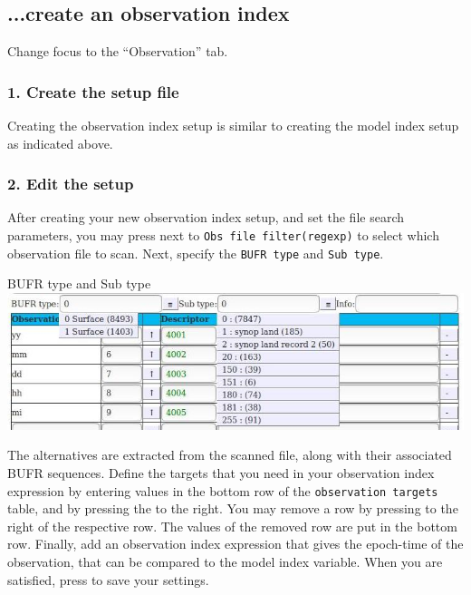 \documentclass[letterpaper,10pt,twoside,twocolumn,openany]{book}
\begin{document}
{\subsection{...create an observation index}
Change focus to the ``Observation'' tab. 

\subsubsection{1. Create the setup file}
Creating the observation index setup is similar to creating the model index setup as indicated above.

\subsubsection{2. Edit the setup}
After creating your new observation index setup, and set the file search parameters,
you may press  next to
\lstinline!Obs file filter(regexp)! to select which observation file to scan.
Next, specify the \lstinline!BUFR type! and \lstinline!Sub type!.
\begin{paperbox}{BUFR type and Sub type}
  \includegraphics[width=\columnwidth]{how_obs.jpg}
\end{paperbox}
The alternatives are extracted from the scanned file, along with their associated BUFR sequences.
Define the targets that you need in your observation index expression by entering values
in the bottom row of the \lstinline!observation targets! table, and by pressing the  to the right.
You may remove a row by pressing   to the right of the respective row.
The values of the removed row are put in the bottom row.
Finally, add an observation index expression that gives the epoch-time 
of the observation, that can be compared to the model index variable.
When you are satisfied, press  to save your settings.

}
\end{document}
